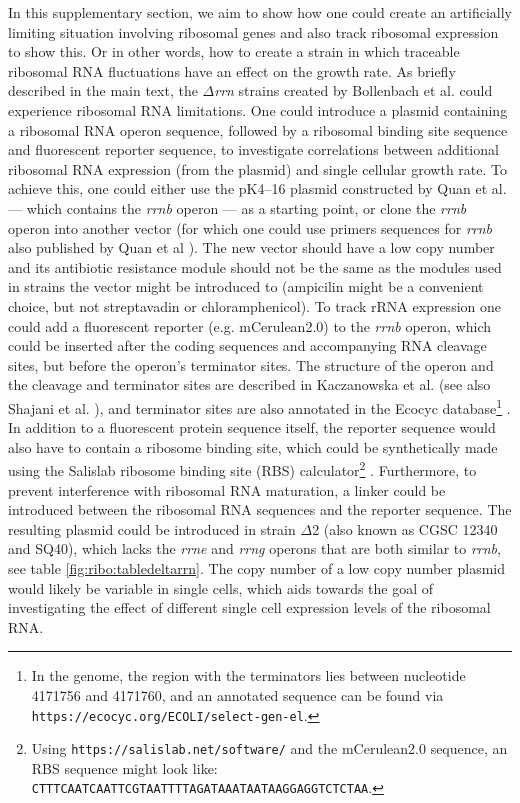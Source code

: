 In this supplementary section, we aim to show how one could create an artificially limiting situation involving ribosomal genes and also track ribosomal expression to show this. 
Or in other words, how to create a strain in which traceable ribosomal RNA fluctuations have an effect on the growth rate. 
%
%
As briefly described in the main text, the $\Delta$\textit{rrn} strains created by Bollenbach et al. \cite{Bollenbach2009} could experience ribosomal RNA limitations.
%
One could introduce a plasmid containing a ribosomal RNA operon sequence, followed by a ribosomal binding site sequence and fluorescent reporter sequence, 
to investigate correlations between additional ribosomal RNA expression (from the plasmid) and single cellular growth rate.
%
To achieve this, one could either use the pK4--16 plasmid constructed by Quan et al. \cite{Quan2013} --- which contains the \textit{rrnb} operon --- as a starting point, or clone the \textit{rrnb} operon into another vector (for which one could use primers sequences for \textit{rrnb} also published by Quan et al \cite{Quan2013}).
%
The new vector should have a low copy number and its antibiotic resistance module should not be the same as the modules used in strains the vector might be introduced to (ampicilin might be a convenient choice, but not streptavadin or chloramphenicol).
%
To track rRNA expression one could add a 
fluorescent reporter (e.g. mCerulean2.0) to the \textit{rrnb} operon, 
which could be inserted after the coding sequences and accompanying RNA cleavage sites, but before the operon's terminator sites.
%
The structure of the operon and the cleavage and terminator sites are described in Kaczanowska et al. \cite{Kaczanowska2007} (see also Shajani et al. \cite{Shajani2011}),
%
and terminator sites are also annotated in the Ecocyc database\footnote{In the \ecoli genome, the region with the terminators lies between nucleotide 4171756 and 4171760, and an annotated sequence can be found via \texttt{https://ecocyc.org/ECOLI/select-gen-el}.} \cite{Keseler2017}.
%
In addition to a fluorescent protein sequence itself, the reporter sequence would also have to contain a ribosome binding site, which could be synthetically made using the Salislab ribosome binding site (RBS) calculator\footnote{Using \texttt{https://salislab.net/software/} and the mCerulean2.0 sequence, an RBS sequence might look like: \newline\texttt{CTTTCAATCAATTCGTAATTTTAGATAAATAATAAGGAGGTCTCTAA}.} \cite{Salis2009, Salis2011}. 
Furthermore, to prevent interference with ribosomal RNA maturation, a linker could be introduced between the ribosomal RNA sequences and the reporter sequence.
%
The resulting plasmid could be introduced in strain $\Delta$2 (also known as CGSC 12340 and SQ40), which lacks the \textit{rrne} and \textit{rrng} operons that are both similar to \textit{rrnb}, see table \ref{fig:ribo:tabledeltarrn}.
%
The copy number of a low copy number plasmid would likely be variable in single cells, which aids towards the goal of investigating the effect of different single cell expression levels of the ribosomal RNA.

